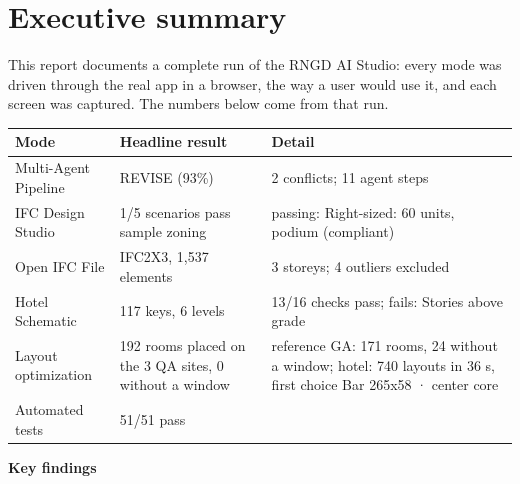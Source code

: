 \documentclass[10pt]{article}
\begin{document}
\section{Executive summary}
This report documents a complete run of the RNGD AI Studio: every mode was driven through the real app in a
browser, the way a user would use it, and each screen was captured. The numbers below come from that run.
{\small \begin{longtable}{p{3.4cm}p{5.2cm}p{7.6cm}}
\toprule
\textbf{Mode} & \textbf{Headline result} & \textbf{Detail} \\ \midrule \endhead
Multi-Agent Pipeline & REVISE (93\%) & 2 conflicts; 11 agent steps \\
IFC Design Studio & 1/5 scenarios pass sample zoning & passing: Right-sized: 60 units, podium (compliant) \\
Open IFC File & IFC2X3, 1,537 elements & 3 storeys; 4 outliers excluded \\
Hotel Schematic & 117 keys, 6 levels & 13/16 checks pass; fails: Stories above grade \\
Layout optimization & 192 rooms placed on the 3 QA sites, 0 without a window & reference GA: 171 rooms, 24 without a window; hotel: 740 layouts in 36 s, first choice Bar 265x58 · center core \\
Automated tests & 51/51 pass &  \\
\bottomrule
\end{longtable}}
\textbf{Key findings}
\end{document}
